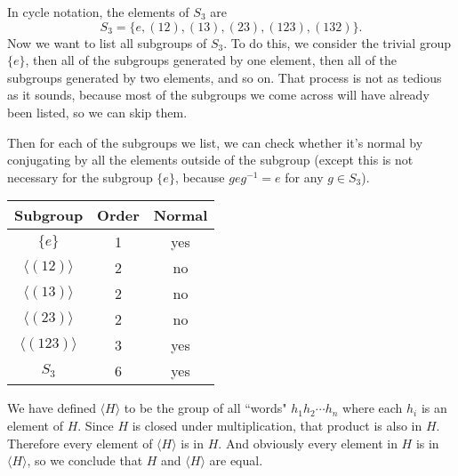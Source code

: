 \documentclass[12pt]{article}
\begin{document}
\bigskip
\noindent{}\bigskip

In cycle notation, the elements of $S_3$ are
\[ S_3 = \{e, (12), (13), (23), (123), (132) \}. \]
Now we want to list all subgroups of $S_3$. To do this, we consider the trivial group $\{e\}$, then all of the subgroups generated by one element, then all of the subgroups generated by two elements, and so on. That process is not as tedious as it sounds, because most of the subgroups we come across will have already been listed, so we can skip them.
\par
Then for each of the subgroups we list, we can check whether it's normal by conjugating by all the elements outside of the subgroup (except this is not necessary for the subgroup $\{ e \}$, because $geg^{-1} = e$ for any $g \in S_3$).
\par
\bigskip
{\centering
\begin{tabular}{|c|c|c|}
    \hline
    Subgroup & Order & Normal \\
    \hline
    \hline
    $\{ e \}$ & 1 & yes \\
    $\langle (12) \rangle$ & 2 & no \\
    $\langle (13) \rangle$ & 2 & no \\
    $\langle (23) \rangle$ & 2 & no \\
    $\langle (123) \rangle$ & 3 & yes \\
    $S_3$ & 6 & yes \\
    \hline
\end{tabular}\par}
\bigskip

\bigskip
\noindent{}\bigskip

We have defined $\langle H \rangle$ to be the group of all ``words" $h_1 h_2 \cdots h_n$ where each $h_i$ is an element of $H$. Since $H$ is closed under multiplication, that product is also in $H$. Therefore every element of $\langle H \rangle$ is in $H$. And obviously every element in $H$ is in $\langle H \rangle$, so we conclude that $H$ and $\langle H \rangle$ are equal.

\bigskip
\noindent{}\bigskip
\end{document}
